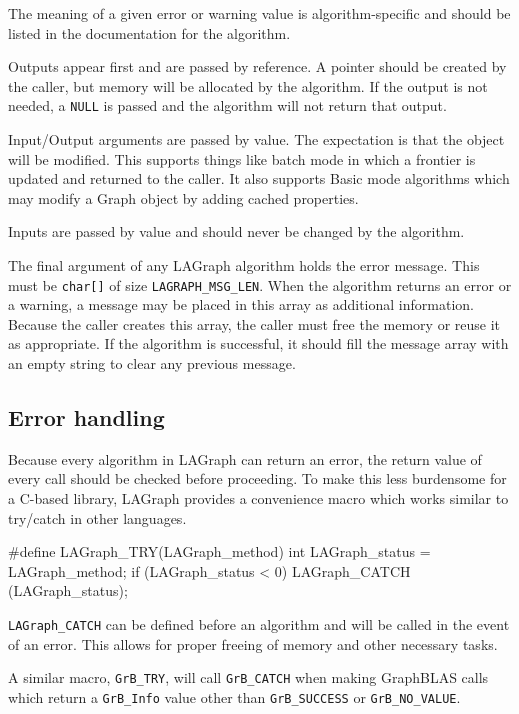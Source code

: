 The meaning of a given error or warning value is algorithm-specific
and should be listed in the documentation for the algorithm.

Outputs appear first and are passed by reference. A pointer should be created by the caller, but
memory will be allocated by the algorithm. If the output is not needed, a \verb'NULL' is passed and the
algorithm will not return that output.

Input/Output arguments are passed by value. The expectation is that the object will be modified.
This supports things like batch mode in which a frontier is updated and returned to the caller.
It also supports Basic mode algorithms which may modify a Graph object by adding cached properties.

Inputs are passed by value and should never be changed by the algorithm.

The final argument of any LAGraph algorithm holds the error message. This must be \verb'char[]' of
size \verb'LAGRAPH_MSG_LEN'. When the algorithm returns an error or a warning, a message may be placed in
this array as additional information. Because the caller creates this array, the caller must free
the memory or reuse it as appropriate. If the algorithm is successful, it should fill the message array
with an empty string to clear any previous message.


\subsection{Error handling}

Because every algorithm in LAGraph can return an error, the return value of every call should be
checked before proceeding. To make this less burdensome for a C-based library, LAGraph provides a
convenience macro which works similar to try/catch in other languages.

\begin{cplus}
#define LAGraph_TRY(LAGraph_method)
{
    int LAGraph_status = LAGraph_method;
    if (LAGraph_status < 0)
    {
        LAGraph_CATCH (LAGraph_status);
    }
}
\end{cplus}


\verb'LAGraph_CATCH' can be defined before an algorithm and will be called in the event of an error.
This allows for proper freeing of memory and other necessary tasks.

A similar macro, \verb'GrB_TRY', will call \verb'GrB_CATCH' when making GraphBLAS calls which return
a \verb'GrB_Info' value other than \verb'GrB_SUCCESS' or \verb'GrB_NO_VALUE'.

